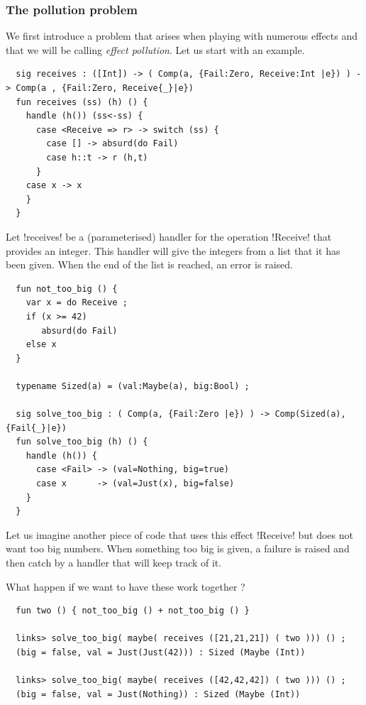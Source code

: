 \documentclass[10pt, nonacm=true, language=french, language=english]{acmart}
\begin{document}
\subsubsection{The pollution problem}
\label{sec:pollution-problem}

We first introduce a problem that arises when playing with numerous effects and that we will be calling \emph{effect pollution}. Let us start with an example.

\begin{lstlisting}
  sig receives : ([Int]) -> ( Comp(a, {Fail:Zero, Receive:Int |e}) ) -> Comp(a , {Fail:Zero, Receive{_}|e})
  fun receives (ss) (h) () {
    handle (h()) (ss<-ss) {
      case <Receive => r> -> switch (ss) {
        case [] -> absurd(do Fail)
        case h::t -> r (h,t)
      }
    case x -> x
    }
  }
\end{lstlisting}

Let !receives! be a (parameterised) handler for the operation !Receive! that provides an integer. This handler will give the integers from a list that it has been given. When the end of the list is reached, an error is raised.

\begin{lstlisting}
  fun not_too_big () {
    var x = do Receive ;
    if (x >= 42)
       absurd(do Fail)
    else x
  }

  typename Sized(a) = (val:Maybe(a), big:Bool) ;

  sig solve_too_big : ( Comp(a, {Fail:Zero |e}) ) -> Comp(Sized(a), {Fail{_}|e})
  fun solve_too_big (h) () {
    handle (h()) {
      case <Fail> -> (val=Nothing, big=true)
      case x      -> (val=Just(x), big=false)
    }
  }
\end{lstlisting}

Let us imagine another piece of code that uses this effect !Receive! but does not want too big numbers. When something too big is given, a failure is raised and then catch by a handler that will keep track of it.

What happen if we want to have these work together ?

\begin{lstlisting}
  fun two () { not_too_big () + not_too_big () }

  links> solve_too_big( maybe( receives ([21,21,21]) ( two ))) () ;
  (big = false, val = Just(Just(42))) : Sized (Maybe (Int))

  links> solve_too_big( maybe( receives ([42,42,42]) ( two ))) () ;
  (big = false, val = Just(Nothing)) : Sized (Maybe (Int))
\end{lstlisting}
\end{document}
